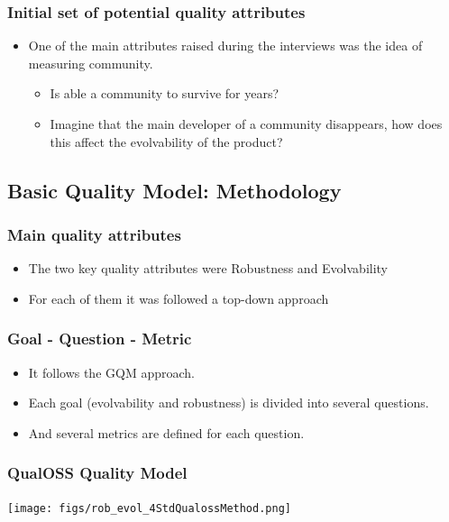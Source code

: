 \documentclass{beamer}
\begin{document}
\begin{frame}
\frametitle{Initial set of potential quality attributes}
\begin{center}
\begin{itemize}
\item One of the main attributes raised during the interviews was
the idea of measuring community.
\begin{itemize}
\item Is able a community to survive for years?
\item Imagine that the main developer of a community disappears, how does this affect the evolvability of the product?
\end{itemize}
\end{itemize}
\end{center}
\end{frame}

\subsection{Basic Quality Model: Methodology}

\begin{frame}
\frametitle{Main quality attributes}
\begin{center}
\begin{itemize}
\item The two key quality attributes were Robustness and Evolvability
\item For each of them it was followed a top-down approach
\end{itemize}
\end{center}
\end{frame}


\begin{frame}
\frametitle{Goal - Question - Metric}
\begin{center}
\begin{itemize}
\item It follows the GQM approach.
\item Each goal (evolvability and robustness) is divided into several questions.
\item And several metrics are defined for each question.

\end{itemize}
\end{center}
\end{frame}


\begin{frame}
\frametitle{QualOSS Quality Model}
\begin{center}
\begin{itemize}
\end{itemize}
\texttt{[image: figs/rob\_evol\_4StdQualossMethod.png]}
\end{center}
\end{frame}
\end{document}
